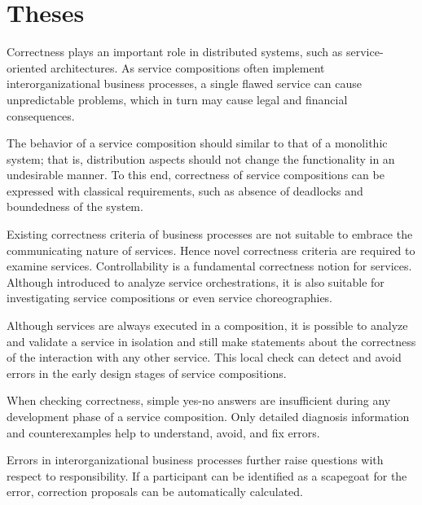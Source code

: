 \chapter*{Theses}

\begin{niceenumerate}
\item Correctness plays an important role in distributed systems, such as service-oriented architectures. As service compositions often implement interorganizational business processes, a single flawed service can cause unpredictable problems, which in turn may cause legal and financial consequences.



\item The behavior of a service composition should similar to that of a monolithic system; that is, distribution aspects should not change the functionality in an undesirable manner. To this end, correctness of service compositions can be expressed with classical requirements, such as absence of deadlocks and boundedness of the system.



\item Existing correctness criteria of business processes are not suitable to embrace the communicating nature of services. Hence novel correctness criteria are required to examine services. Controllability is a fundamental correctness notion for services. Although introduced to analyze service orchestrations, it is also suitable for investigating service compositions or even service choreographies.



\item Although services are always executed in a composition, it is possible to analyze and validate a service in isolation and still make statements about the correctness of the interaction with any other service. This local check can detect and avoid errors in the early design stages of service compositions.



\item When checking correctness, simple yes-no answers are insufficient during any development phase of a service composition. Only detailed diagnosis information and counterexamples help to understand, avoid, and fix errors.



\item Errors in interorganizational business processes further raise questions with respect to responsibility. If a  participant can be identified as a scapegoat for the error, correction proposals can be automatically calculated.




\end{niceenumerate}
